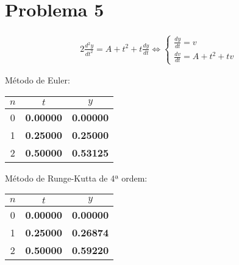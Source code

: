 {\section{Problema 5}
\begin{alignat*}{2}
    \frac{d^2y}{dt^2}=A+t^2+t\frac{dy}{dt} \iff
    \begin{cases}
        \frac{dy}{dt} = v \\
        \frac{dv}{dt} = A+t^2+tv
    \end{cases}
\end{alignat*}

\begin{center}
    \begin{minipage}[c]{0.5\textwidth}
        \begin{center}
            Método de Euler:\\
            \begin{tabular}{c | c c}
                $n$ & $t$ & $y$ \\ \hline
                0 &      \textbf{0.00000} & \textbf{0.00000} \\
                1 &      \textbf{0.25000} & \textbf{0.25000} \\
                2 &      \textbf{0.50000} & \textbf{0.53125}
            \end{tabular}
        \end{center}
    \end{minipage}%
    \begin{minipage}[c]{0.5\textwidth}
        \begin{center}
            Método de Runge-Kutta de 4ª ordem:\\
            \begin{tabular}{c | c c}
                $n$ & $t$ & $y$ \\ \hline
                0 &      \textbf{0.00000} & \textbf{0.00000} \\
                1 &      \textbf{0.25000} & \textbf{0.26874} \\
                2 &      \textbf{0.50000} & \textbf{0.59220}
            \end{tabular}
        \end{center}
    \end{minipage}
\end{center}

}
